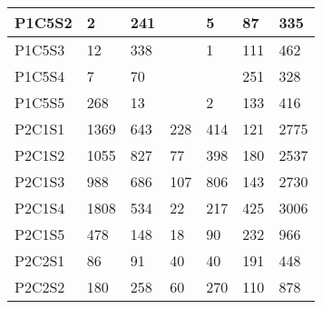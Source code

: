 \begin{longtable}{lllllll}
\multicolumn{1}{|l|}{P1C5S2} & \multicolumn{1}{l|}{2} & \multicolumn{1}{l|}{241} & \multicolumn{1}{l|}{} & \multicolumn{1}{l|}{5} & \multicolumn{1}{l|}{87} & \multicolumn{1}{l|}{335} \\ \hline
\multicolumn{1}{|l|}{P1C5S3} & \multicolumn{1}{l|}{12} & \multicolumn{1}{l|}{338} & \multicolumn{1}{l|}{} & \multicolumn{1}{l|}{1} & \multicolumn{1}{l|}{111} & \multicolumn{1}{l|}{462} \\ \hline
\multicolumn{1}{|l|}{P1C5S4} & \multicolumn{1}{l|}{7} & \multicolumn{1}{l|}{70} & \multicolumn{1}{l|}{} & \multicolumn{1}{l|}{} & \multicolumn{1}{l|}{251} & \multicolumn{1}{l|}{328} \\ \hline
\multicolumn{1}{|l|}{P1C5S5} & \multicolumn{1}{l|}{268} & \multicolumn{1}{l|}{13} & \multicolumn{1}{l|}{} & \multicolumn{1}{l|}{2} & \multicolumn{1}{l|}{133} & \multicolumn{1}{l|}{416} \\ \hline
\multicolumn{1}{|l|}{P2C1S1} & \multicolumn{1}{l|}{1369} & \multicolumn{1}{l|}{643} & \multicolumn{1}{l|}{228} & \multicolumn{1}{l|}{414} & \multicolumn{1}{l|}{121} & \multicolumn{1}{l|}{2775} \\ \hline
\multicolumn{1}{|l|}{P2C1S2} & \multicolumn{1}{l|}{1055} & \multicolumn{1}{l|}{827} & \multicolumn{1}{l|}{77} & \multicolumn{1}{l|}{398} & \multicolumn{1}{l|}{180} & \multicolumn{1}{l|}{2537} \\ \hline
\multicolumn{1}{|l|}{P2C1S3} & \multicolumn{1}{l|}{988} & \multicolumn{1}{l|}{686} & \multicolumn{1}{l|}{107} & \multicolumn{1}{l|}{806} & \multicolumn{1}{l|}{143} & \multicolumn{1}{l|}{2730} \\ \hline
\multicolumn{1}{|l|}{P2C1S4} & \multicolumn{1}{l|}{1808} & \multicolumn{1}{l|}{534} & \multicolumn{1}{l|}{22} & \multicolumn{1}{l|}{217} & \multicolumn{1}{l|}{425} & \multicolumn{1}{l|}{3006} \\ \hline
\multicolumn{1}{|l|}{P2C1S5} & \multicolumn{1}{l|}{478} & \multicolumn{1}{l|}{148} & \multicolumn{1}{l|}{18} & \multicolumn{1}{l|}{90} & \multicolumn{1}{l|}{232} & \multicolumn{1}{l|}{966} \\ \hline
\multicolumn{1}{|l|}{P2C2S1} & \multicolumn{1}{l|}{86} & \multicolumn{1}{l|}{91} & \multicolumn{1}{l|}{40} & \multicolumn{1}{l|}{40} & \multicolumn{1}{l|}{191} & \multicolumn{1}{l|}{448} \\ \hline
\multicolumn{1}{|l|}{P2C2S2} & \multicolumn{1}{l|}{180} & \multicolumn{1}{l|}{258} & \multicolumn{1}{l|}{60} & \multicolumn{1}{l|}{270} & \multicolumn{1}{l|}{110} & \multicolumn{1}{l|}{878} \\ \hline

\end{longtable}

